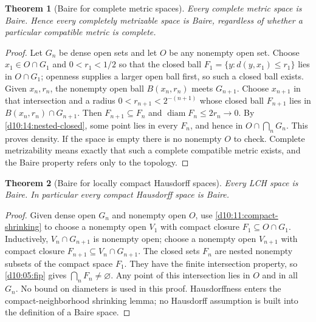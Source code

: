 \documentclass[11pt,oneside,openany]{book}
\newtheorem{theorem}{Theorem}[chapter]
\theoremstyle{definition}
\theoremstyle{remark}
\DeclareMathOperator{\diam}{diam}
\begin{document}
\begin{theorem}[Baire for complete metric spaces]\label{d10:14:baire-metric}
Every complete metric space is Baire. Hence every completely metrizable space is Baire, regardless of whether a particular compatible metric is complete.
\end{theorem}
\begin{proof}
Let $G_n$ be dense open sets and let $O$ be any nonempty open set. Choose $x_1\in O\cap G_1$ and $0<r_1<1/2$ so that the closed ball $F_1=\{y:d(y,x_1)\leq r_1\}$ lies in $O\cap G_1$; openness supplies a larger open ball first, so such a closed ball exists. Given $x_n,r_n$, the nonempty open ball $B(x_n,r_n)$ meets $G_{n+1}$. Choose $x_{n+1}$ in that intersection and a radius $0<r_{n+1}<2^{-(n+1)}$ whose closed ball $F_{n+1}$ lies in $B(x_n,r_n)\cap G_{n+1}$. Then $F_{n+1}\subseteq F_n$ and $\diam F_n\leq2r_n\to0$. By \cref{d10:14:nested-closed}, some point lies in every $F_n$, and hence in $O\cap\bigcap_nG_n$. This proves density. If the space is empty there is no nonempty $O$ to check. Complete metrizability means exactly that such a complete compatible metric exists, and the Baire property refers only to the topology.
\end{proof}

\begin{theorem}[Baire for locally compact Hausdorff spaces]\label{d10:14:baire-lch}
Every LCH space is Baire. In particular every compact Hausdorff space is Baire.
\end{theorem}
\begin{proof}
Given dense open $G_n$ and nonempty open $O$, use \cref{d10:11:compact-shrinking} to choose a nonempty open $V_1$ with compact closure $F_1\subseteq O\cap G_1$. Inductively, $V_n\cap G_{n+1}$ is nonempty open; choose a nonempty open $V_{n+1}$ with compact closure $F_{n+1}\subseteq V_n\cap G_{n+1}$. The closed sets $F_n$ are nested nonempty subsets of the compact space $F_1$. They have the finite intersection property, so \cref{d10:05:fip} gives $\bigcap_nF_n\ne\varnothing$. Any point of this intersection lies in $O$ and in all $G_n$. No bound on diameters is used in this proof. Hausdorffness enters the compact-neighborhood shrinking lemma; no Hausdorff assumption is built into the definition of a Baire space.
\end{proof}
\end{document}
